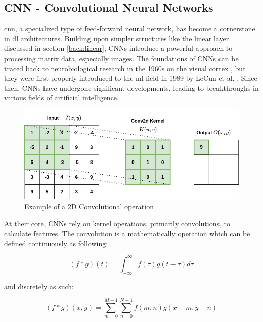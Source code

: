 \subsection{CNN - Convolutional Neural Networks}
\label{back:cnn}

\acrfull{cnn}, a specialized type of feed-forward neural network, has become a cornerstone in \acrshort{dl} architectures. Building upon simpler structures like the linear layer discussed in section \ref{back:linear}, CNNs introduce a powerful approach to processing matrix data, especially images.
The foundations of CNNs can be traced back to neurobiological research in the 1960s on the visual cortex \cite{hubel1962receptive}, but they were first properly introduced to the \acrshort{ml} field in 1989 by LeCun et al. \cite{NIPS1989_53c3bce6}. Since then, CNNs have undergone significant developments, leading to breakthroughs in various fields of artificial intelligence. \\

\begin{figure}[!h]
    \centering
    \includegraphics[width=0.8\linewidth]{figures/convolution.png}
    \caption{Example of a 2D Convolutional operation}
    \label{fig:2dconv}
\end{figure}

At their core, CNNs rely on kernel operations, primarily convolutions, to calculate features. The convolution is a mathematically operation which can be defined continuously as following:

\begin{equation}
(f * g)(t) = \int_{-\infty}^{\infty} f(\tau) g(t - \tau) d\tau
\label{eq:contconv}
\end{equation}

and discretely as such:

\begin{equation}
   (f * g)(x, y) = \sum_{m=0}^{M-1} \sum_{n=0}^{N-1} f(m, n)g(x-m, y-n) 
\label{eq:conv}
\end{equation}

